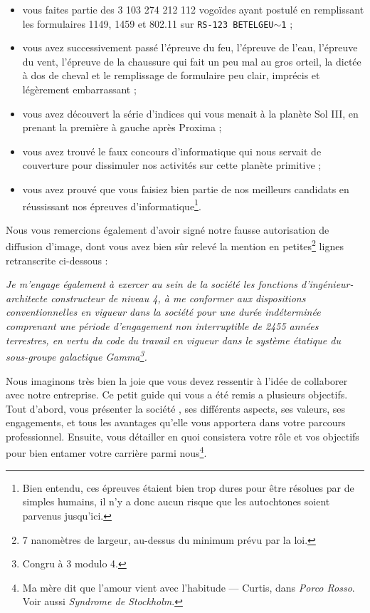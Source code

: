\begin{itemize}
    \item vous faites partie des 3 103 274 212 112 vogoïdes ayant postulé en
        remplissant les formulaires 1149, 1459 et 802.11 sur \texttt{RS-123
        BETELGEU$\sim$1} ;
    \item vous avez successivement passé l'épreuve du feu, l'épreuve de l'eau,
        l'épreuve du vent, l'épreuve de la chaussure qui fait un peu mal au
        gros orteil, la dictée à dos de cheval et le remplissage de formulaire
        peu clair, imprécis et légèrement embarrassant ;
    \item vous avez découvert la série d'indices qui vous menait à la planète
        Sol III, en prenant la première à gauche après Proxima ;
    \item vous avez trouvé le faux concours d'informatique qui nous servait de
        couverture pour dissimuler nos activités sur cette planète primitive ;
    \item vous avez prouvé que vous faisiez bien partie de nos meilleurs
        candidats en réussissant nos épreuves d'informatique\footnote{Bien
        entendu, ces épreuves étaient bien trop dures pour être résolues par de
        simples humains, il n'y a donc aucun risque que les autochtones soient
        parvenus jusqu'ici.}.
\end{itemize}

Nous vous remercions également d'avoir signé notre fausse autorisation de
diffusion d'image, dont vous avez bien sûr relevé la mention en
petites\footnote{7 nanomètres de largeur, au-dessus du minimum prévu par la
loi.} lignes retranscrite ci-dessous :

\emph{Je m'engage également à exercer au sein de la société \provogon{} les
fonctions d'ingénieur-architecte constructeur de niveau 4, à me conformer aux
dispositions conventionnelles en vigueur dans la société \provogon{} pour une
durée indéterminée comprenant une période d'engagement non interruptible de
2455 années terrestres, en vertu du code du travail en vigueur dans le système
étatique du sous-groupe galactique Gamma\footnote{Congru à 3 modulo 4.}.}

\newpage

Nous imaginons très bien la joie que vous devez ressentir à l'idée de
collaborer avec notre entreprise. Ce petit guide qui vous a été remis a
plusieurs objectifs. Tout d'abord, vous présenter la société \provogon{}, ses différents
aspects, ses valeurs, ses engagements, et tous les avantages qu'elle vous
apportera dans votre parcours professionnel. Ensuite, vous détailler en quoi
consistera votre rôle et vos objectifs pour bien entamer votre carrière parmi
nous\footnote{\og Ma mère dit que l'amour vient avec l'habitude \fg{} --- Curtis, dans \emph{Porco Rosso}. Voir aussi \emph{Syndrome de Stockholm}.}.

